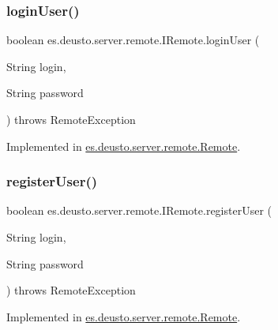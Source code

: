 \mbox{\label{interfacees_1_1deusto_1_1server_1_1remote_1_1_i_remote_a19acdbd6565b0f00cbe860a3316071ad}} 
\subsubsection{\texorpdfstring{login\+User()}{loginUser()}}
{\footnotesize\ttfamily boolean es.\+deusto.\+server.\+remote.\+I\+Remote.\+login\+User (\begin{DoxyParamCaption}\item[{String}]{login,  }\item[{String}]{password }\end{DoxyParamCaption}) throws Remote\+Exception}



Implemented in \hyperlink{classes_1_1deusto_1_1server_1_1remote_1_1_remote_a1c8e0153dd9b3f6d5499eb6d01e48bbe}{es.\+deusto.\+server.\+remote.\+Remote}.

\mbox{\label{interfacees_1_1deusto_1_1server_1_1remote_1_1_i_remote_aea9a185d69da02d134443a3802a20b32}} 
\subsubsection{\texorpdfstring{register\+User()}{registerUser()}}
{\footnotesize\ttfamily boolean es.\+deusto.\+server.\+remote.\+I\+Remote.\+register\+User (\begin{DoxyParamCaption}\item[{String}]{login,  }\item[{String}]{password }\end{DoxyParamCaption}) throws Remote\+Exception}



Implemented in \hyperlink{classes_1_1deusto_1_1server_1_1remote_1_1_remote_a4b013f75d23e2c9f0dbca2d3bb467f6a}{es.\+deusto.\+server.\+remote.\+Remote}.

